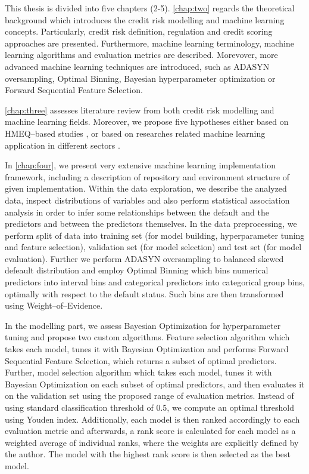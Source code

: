 This thesis is divided into five chapters (2-5).  \autoref{chap:two} regards the theoretical background which introduces the credit risk modelling and machine learning concepts. Particularly, credit risk definition, regulation and credit scoring approaches are presented.
Furthermore, machine learning terminology, machine learning algorithms and evaluation metrics are described.
Morevover, more advanced machine learning techniques are introduced, such as ADASYN oversampling, Optimal Binning, Bayesian hyperparameter optimization or Forward Sequential Feature Selection.

\autoref{chap:three} assesses literature review from both credit risk modelling and machine learning fields. Moreover, we propose five hypotheses either based on HMEQ--based studies \citep{serkan2021bagging, zurada2014classification}, or based on researches related machine learning application in different sectors \citep{de2023predicting, pintelas2020grey, wu2018accurate}.

In \autoref{chap:four}, we present very extensive machine learning implementation framework, including a description of repository and environment structure of given implementation. Within the data exploration, we describe the analyzed data, inspect distributions of variables and also perform statistical association analysis in order to infer some relationships between the default and the predictors and between the predictors themselves.
In the data preprocessing, we perform split of data into training set (for model building, hyperparameter tuning and feature selection), validation set (for model selection) and test set (for model evaluation).
Further we perform ADASYN oversampling to balanced skewed defeault distribution and employ Optimal Binning which bins numerical predictors into interval bins and categorical predictors into categorical group bins, optimally with respect to the default status. Such bins are then transformed using Weight--of--Evidence.

In the modelling part, we assess Bayesian Optimization for hyperparameter tuning and propose two custom algorithms. Feature selection algorithm which takes each model, tunes it with Bayesian Optimization and performs Forward Sequential Feature Selection, which returns a subset of optimal predictors.
Further, model selection algorithm which takes each model, tunes it with Bayesian Optimization on each subset of optimal predictors, and then evaluates it on the validation set using the proposed range of evaluation metrics. Instead of using standard classification threshold of 0.5, we compute an optimal threshold using Youden index.
Additionally, each model is then ranked accordingly to each evaluation metric and afterwards, a rank score is calculated for each model as a weighted average of individual ranks, where the weights are explicitly defined by the author. The model with the highest rank score is then selected as the best model.

